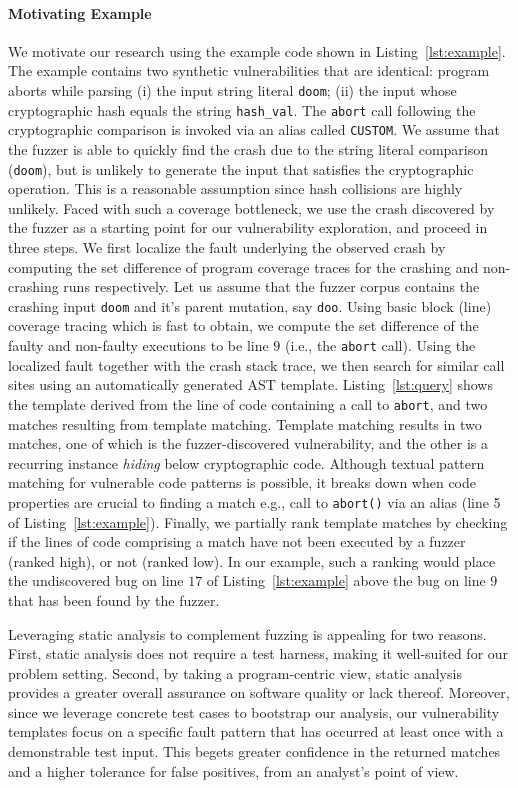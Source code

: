 \paragraph{Motivating Example}
We motivate our research using the example code shown in Listing~\ref{lst:example}.
The example contains two synthetic vulnerabilities that are identical: program aborts while parsing (i) the input string literal {\tt doom}; (ii) the input whose cryptographic hash equals the string {\tt hash\_val}.
The {\tt abort} call following the cryptographic comparison is invoked via an alias called {\tt CUSTOM}.
We assume that the fuzzer is able to quickly find the crash due to the string literal comparison ({\tt doom}), but is unlikely to generate the input that satisfies the cryptographic operation.
This is a reasonable assumption since hash collisions are highly unlikely.
Faced with such a coverage bottleneck, we use the crash discovered by the fuzzer as a starting point for our vulnerability exploration, and proceed in three steps.
We first localize the fault underlying the observed crash by computing the set difference of program coverage traces for the crashing and non-crashing runs respectively.
Let us assume that the fuzzer corpus contains the crashing input {\tt doom} and it's parent mutation, say {\tt doo}.
Using basic block (line) coverage tracing which is fast to obtain, we compute the set difference of the faulty and non-faulty executions to be line $9$ (i.e., the {\tt abort} call).
Using the localized fault together with the crash stack trace, we then search for similar call sites using an automatically generated AST template.
Listing~\ref{lst:query} shows the template derived from the line of code containing a call to {\tt abort}, and two matches resulting from template matching.
Template matching results in two matches, one of which is the fuzzer-discovered vulnerability, and the other is a recurring instance {\it hiding} below cryptographic code.
Although textual pattern matching for vulnerable code patterns is possible, it breaks down when code properties are crucial to finding a match e.g., call to {\tt abort()} via an alias (line 5 of Listing~\ref{lst:example}).
Finally, we partially rank template matches by checking if the lines of code comprising a match have not been executed by a fuzzer (ranked high), or not (ranked low).
In our example, such a ranking would place the undiscovered bug on line $17$ of Listing~\ref{lst:example} above the bug on line $9$ that has been found by the fuzzer.

Leveraging static analysis to complement fuzzing is appealing for two reasons.
First, static analysis does not require a test harness, making it well-suited for our problem setting.
Second, by taking a program-centric view, static analysis provides a greater overall assurance on software quality or lack thereof.
Moreover, since we leverage concrete test cases to bootstrap our analysis, our vulnerability templates focus on a specific fault pattern that has occurred at least once with a demonstrable test input.
This begets greater confidence in the returned matches and a higher tolerance for false positives, from an analyst's point of view.

